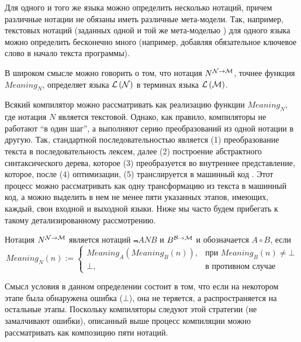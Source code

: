 Для одного и того же языка можно определить несколько нотаций, причем различные нотации не обязаны иметь различные мета-модели. Так, например, текстовых нотаций (заданных одной и той же мета-моделью ) для одного языка можно определить бесконечно много (например, добавляя обязательное ключевое слово в начало текста программы).

В широком смысле можно говорить о том, что нотация $N^{{\mathcal{N}} \rightarrow{} {\mathcal{M}}}$, точнее функция $Meaning_N$, определяет  \cite{???} языка $\mathcal{L}\left(\mathcal{N}\right)$ в терминах языка $\mathcal{L}\left(\mathcal{M}\right)$.

Всякий компилятор можно рассматривать как реализацию функции $Meaning_N$, где нотация $N$ является текстовой. Однако, как правило, компиляторы не работают ``в один шаг'', а выполняют серию преобразований из одной нотации в другую. Так, стандартной последовательностью является (1) преобразование текста в последовательность лексем, далее (2) построение абстрактного синтаксического дерева, которое (3) преобразуется во внутреннее представление, которое, после (4) оптимизации, (5) транслируется в машинный код \cite{Dragon}. Этот процесс можно рассматривать как одну трансформацию из текста в машинный код, а можно выделить в нем не менее пяти указанных этапов, имеющих, каждый, свои входной и выходной языки. Ниже мы часто будем прибегать к такому детализированному рассмотрению.
\newcommand{\Comp}[2]{#1 \circ #2}
\begin{Def}
Нотация $N^{{\mathcal{N}} \rightarrow{} {\mathcal{M}}}$ является  нотаций $\Not{A}{N}{B}$ и $B^{{\mathcal{B}} \rightarrow{} {\mathcal{M}}}$ и обозначается $\Comp{A}{B}$, если 
	$$Meaning_N(n) := \left\{\begin{array}{ll}
		Meaning_{A}(Meaning_{B}(n)), & \mbox{при } Meaning_{B}(n) \neq \bot\\
		\bot, & \mbox{в противном случае}
	\end{array}\right.$$
\end{Def}

Смысл условия в данном определении состоит в том, что если на некотором этапе была обнаружена ошибка ($\bot$), она не теряется, а распространяется на остальные этапы. Поскольку компиляторы следуют этой стратегии (не замалчивают ошибки), описанный выше процесс компиляции можно рассматривать как композицию пяти нотаций.


